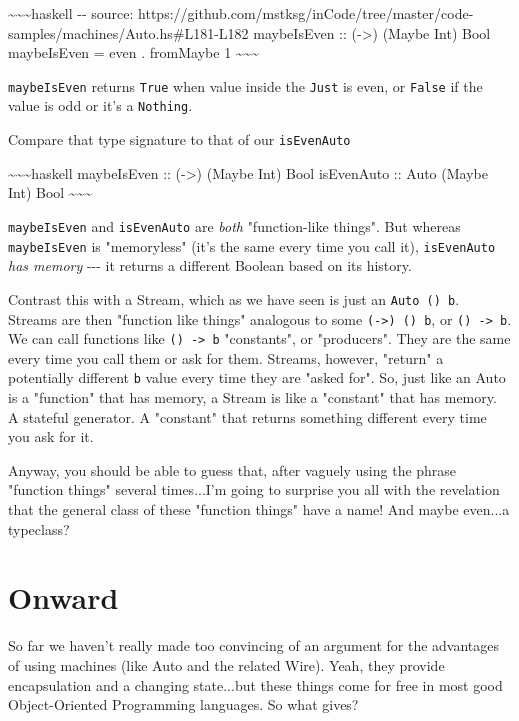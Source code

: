 \documentclass[]{article}
\begin{document}
\textasciitilde{}\textasciitilde{}\textasciitilde{}haskell -\/- source:
https://github.com/mstksg/inCode/tree/master/code-samples/machines/Auto.hs\#L181-L182
maybeIsEven :: (-\textgreater{}) (Maybe Int) Bool maybeIsEven = even . fromMaybe
1 \textasciitilde{}\textasciitilde{}\textasciitilde{}

\texttt{maybeIsEven} returns \texttt{True} when value inside the \texttt{Just}
is even, or \texttt{False} if the value is odd or it's a \texttt{Nothing}.

Compare that type signature to that of our \texttt{isEvenAuto}

\textasciitilde{}\textasciitilde{}\textasciitilde{}haskell maybeIsEven ::
(-\textgreater{}) (Maybe Int) Bool isEvenAuto :: Auto (Maybe Int) Bool
\textasciitilde{}\textasciitilde{}\textasciitilde{}

\texttt{maybeIsEven} and \texttt{isEvenAuto} are \emph{both} "function-like
things". But whereas \texttt{maybeIsEven} is "memoryless" (it's the same every
time you call it), \texttt{isEvenAuto} \emph{has memory} -\/-\/- it returns a
different Boolean based on its history.

Contrast this with a Stream, which as we have seen is just an
\texttt{Auto\ ()\ b}. Streams are then "function like things" analogous to some
\texttt{(-\textgreater{})\ ()\ b}, or \texttt{()\ -\textgreater{}\ b}. We can
call functions like \texttt{()\ -\textgreater{}\ b} "constants", or "producers".
They are the same every time you call them or ask for them. Streams, however,
"return" a potentially different \texttt{b} value every time they are "asked
for". So, just like an Auto is a "function" that has memory, a Stream is like a
"constant" that has memory. A stateful generator. A "constant" that returns
something different every time you ask for it.

Anyway, you should be able to guess that, after vaguely using the phrase
"function things" several times...I'm going to surprise you all with the
revelation that the general class of these "function things" have a name! And
maybe even...a typeclass?

\section{Onward}

So far we haven't really made too convincing of an argument for the advantages
of using machines (like Auto and the related Wire). Yeah, they provide
encapsulation and a changing state...but these things come for free in most good
Object-Oriented Programming languages. So what gives?
\end{document}
